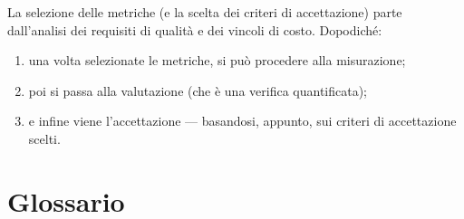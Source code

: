 \documentclass[a4paper]{article}
\begin{document}
		
La selezione delle metriche (e la scelta dei criteri di accettazione) parte dall'analisi dei requisiti di qualità e dei vincoli di costo. Dopodiché:
		
	\begin{enumerate}
		
			
	\item una volta selezionate le metriche, si può procedere alla misurazione;
			
	\item poi si passa alla valutazione (che è una verifica quantificata);
			
	\item e infine viene l'accettazione — basandosi, appunto, sui criteri di accettazione scelti.
		
	\end{enumerate}

	


		
	\newpage
	\appendix
	\section{Glossario}
\end{document}
